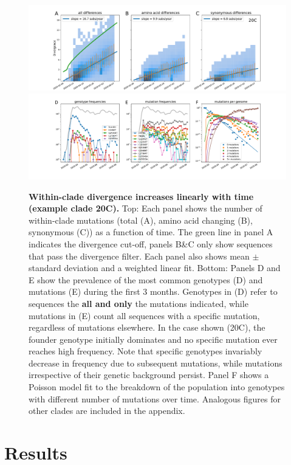\documentclass[aps,rmp, twocolumn]{revtex4}
\begin{document}
\begin{figure}[tb]
    \includegraphics[width=\textwidth]{figures/rtt/20C_rtt.pdf}
    \includegraphics[width=\textwidth]{figures/counts/20C_counts.pdf}
    \caption{{\bf Within-clade divergence increases linearly with time (example clade 20C).} Top: Each panel shows the number of within-clade mutations (total (A), amino acid changing (B), synonymous (C)) as a function of time.
    The green line in panel A indicates the divergence cut-off, panels B\&C only show sequences that pass the divergence filter. Each panel also shows mean $\pm$ standard deviation and a weighted linear fit.
    Bottom: Panels D and E show the prevalence of the most common genotypes (D) and mutations (E) during the first 3 months. Genotypes in (D) refer to sequences the {\bf all and only} the mutations indicated, while mutations in (E) count all sequences with a specific mutation, regardless of mutations elsewhere.
    In the case shown (20C), the founder genotype initially dominates and no specific mutation ever reaches high frequency. Note that specific genotypes invariably decrease in frequency due to subsequent mutations, while mutations irrespective of their genetic background persist. Panel F shows a Poisson model fit to the breakdown of the population into genotypes with different number of mutations over time. Analogous figures for other clades are included in the appendix.
    \label{fig:within_clade}}
\end{figure}

\section*{Results}
\end{document}
